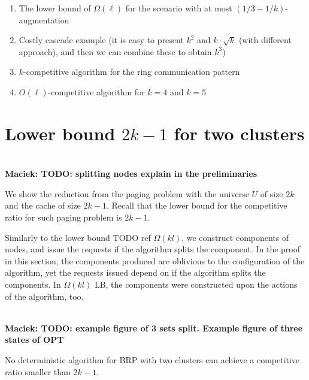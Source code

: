 \documentclass[manuscript,screen=true, review, anonymous]{acmart}
\newcommand\maciek[1]{\color{brown}\textbf{\\ Maciek: #1}\color{black}}
\begin{document}
\begin{enumerate}
  		 \item The lower bound of $\Omega(\ell)$ for the scenario with at most $(1/3-1/k)$-augmentation
  
  		 \item Costly cascade example (it is easy to present $k^2$ and $k\cdot \sqrt{k}$ (with different approach), and then we can combine these to obtain $k^3$)
  
  		 \item $k$-competitive algorithm for the ring communication pattern
  
  		 \item $O(\ell)$-competitive algorithm for $k=4$ and $k=5$
  
  \end{enumerate}

\section{Lower bound $2k-1$ for two clusters}

\maciek{TODO: splitting nodes explain in the preliminaries}

We show the reduction from the paging problem with the universe $U$ of size $2k$ and the cache of size $2k-1$.
Recall that the lower bound for the competitive ratio for such paging problem is $2k-1$.

Similarly to the lower bound TODO ref $\Omega(kl)$, we construct components of nodes, and issue the requests if the algorithm splits the component.
In the proof in this section, the components produced are oblivious to the configuration of the algorithm, yet the requests issued depend on if the algorithm splits the components. In $\Omega(kl)$ LB, the components were constructed upon the actions of the algorithm, too.

\maciek{TODO: example figure of 3 sets split. Example figure of three states of OPT}

\begin{theorem}
  No deterministic algorithm for BRP with two clusters can achieve a competitive ratio smaller than $2k-1$.
\end{theorem}
\end{document}
